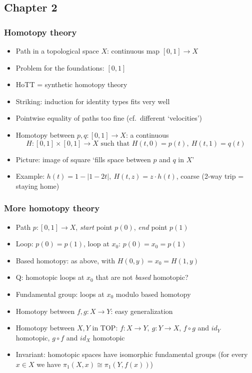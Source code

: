 \documentclass[handout]{beamer}
\begin{document}
  \subsection{Chapter 2}

\frame
  {

    \frametitle{Homotopy theory}

    \begin{itemize}[<+->]
    \item Path in a topological space $X$: continuous map $[0,1]\to X$
    \item Problem for the foundations: $[0,1]$
    \item HoTT = synthetic homotopy theory
    \item Striking: induction for identity types fits very well
    \item Pointwise equality of paths too fine (cf.\ different `velocities')
    \item Homotopy between $p,q: [0,1]\to X$: a continuous 
$$H: [0,1]\times[0,1]\to X \text{ such that } H(t,0)= p(t),~H(t,1) = q(t)$$
    \item Picture: image of square `fills space between $p$ and $q$ in $X$'
    \item Example: $h(t)=1-|1-2t|,~H(t,z)=z\cdot h(t)$, coarse
               (2-way trip = staying home)
    \end{itemize}
  }

\frame
  {

    \frametitle{More homotopy theory}

    \begin{itemize}[<+->]
    \item Path $p: [0,1]\to X$, \emph{start} point $p(0)$, \emph{end} point $p(1)$
    \item Loop: $p(0)=p(1)$, loop at $x_0$: $p(0)=x_0=p(1)$
    \item Based homotopy: as above, with $H(0,y)=x_0=H(1,y)$
    \item Q: homotopic loops at $x_0$ that are not \emph{based} homotopic?
    \item Fundamental group: loops at $x_0$ modulo based homotopy
    \item Homotopy between $f,g: X\to Y$: easy generalization 
    \item Homotopy between $X,Y$ in TOP: $f:X\to Y,~g:Y\to X$,
          $f\circ g$ and $id_Y$ homotopic, $g\circ f$ and $id_X$ homotopic
    \item Invariant: homotopic spaces have isomorphic fundamental groups
          (for every $x\in X$ we have $\pi_1(X,x) \cong \pi_1(Y,f(x))$)
    \end{itemize}
  }
\end{document}
